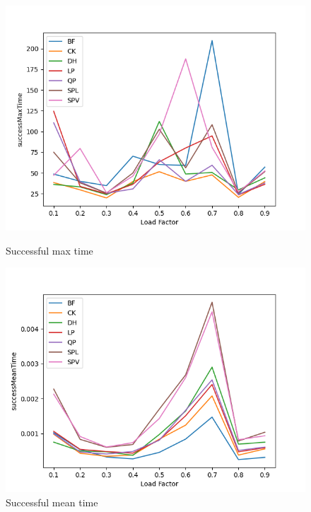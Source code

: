 \documentclass{article}
\begin{document}
        \begin{figure}[H]
          \includegraphics[width=\linewidth]{images/loadFactor_vs_successMaxTime.png}
          \caption{Successful max time}\label{fig:plot2}
        \endminipage\hfill
          \includegraphics[width=\linewidth]{images/loadFactor_vs_successMeanTime.png}
          \caption{Successful mean time}\label{fig:plot3}
        \endminipage
        \end{figure}
    
\end{document}
